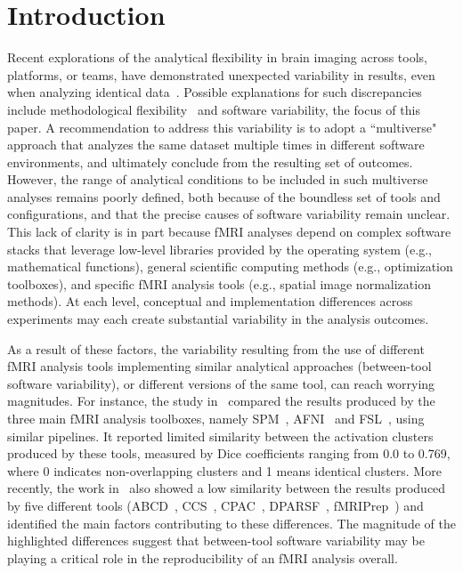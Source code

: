 \renewcommand\fbox{\fcolorbox{black}{white}}
\section{Introduction}

Recent explorations of the analytical flexibility in brain imaging across
tools, platforms, or teams, have demonstrated unexpected variability in
results, even when analyzing identical data~\cite{botvinik2020variability}. Possible explanations for
such discrepancies include methodological flexibility~\cite{carp2012plurality} and software
variability, the focus of this paper. A recommendation to address this
variability is to adopt a ``multiverse" approach that analyzes the same
dataset multiple times in different software environments, and ultimately
conclude from the resulting set of outcomes. However, the range of
analytical conditions to be included in such multiverse analyses remains
poorly defined, both because of the boundless set of tools and
configurations, and that the precise causes of software variability remain
unclear. This lack of clarity is in part because fMRI analyses depend on
complex software stacks that leverage low-level libraries provided by the
operating system (e.g., mathematical functions), general scientific
computing methods (e.g., optimization toolboxes), and specific fMRI
analysis tools (e.g., spatial image normalization methods). At each level,
conceptual and implementation differences across experiments may each
create substantial variability in the analysis outcomes.

As a result of these factors, the variability resulting from the use of
different fMRI analysis tools implementing similar analytical approaches
(between-tool software variability), or different versions of the same tool,
 can reach worrying magnitudes. For instance, the
study in~\cite{bowring2019exploring} compared the results produced by the
three main fMRI analysis toolboxes, namely SPM~\cite{penny2011statistical},
AFNI~\cite{cox1996afni} and FSL~\cite{jenkinson2012fsl}, using similar
pipelines. It reported limited similarity between the activation clusters
produced by these tools, measured by Dice coefficients ranging from 0.0 to
0.769, where 0 indicates non-overlapping
clusters and 1 means identical clusters. More recently, the work
in~\cite{Li2021.12.01.470790} also showed a low similarity between the
results produced by five different tools (ABCD~\cite{feczko2021adolescent},
CCS~\cite{xu2015connectome}, CPAC~\cite{craddock2013towards}, DPARSF~\cite{yan2010dparsf},
fMRIPrep~\cite{esteban2019fmriprep}) and identified the main
factors contributing to these differences. The magnitude of the highlighted
differences suggest that between-tool software variability may be playing a critical
role in the reproducibility of an fMRI analysis overall. 

